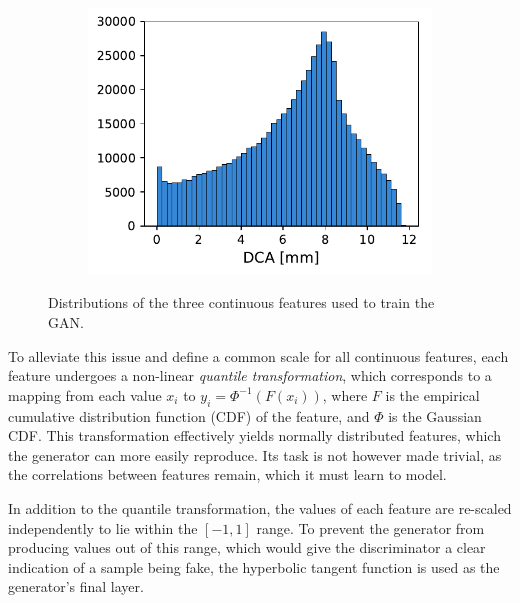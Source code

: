 \begin{figure}
{    \begin{subfigure}[t]{0.35\textwidth}
        \centering
        \hspace{-0.5cm}
        \includegraphics[width=\textwidth]{chapter4/real_doca.pdf}
    \end{subfigure}}
    \caption{Distributions of the three continuous features used to train the GAN.}
    \label{fig:original_feature_distributions}
\end{figure}

To alleviate this issue and define a common scale for all continuous features, each feature undergoes a non-linear \emph{quantile transformation}, which corresponds to a mapping from each value $x_i$ to $y_i = \Phi^{-1}(F(x_i))$, where $F$ is the empirical cumulative distribution function (CDF) of the feature, and $\Phi$ is the Gaussian CDF. This transformation effectively yields normally distributed features, which the generator can more easily reproduce. Its task is not however made trivial, as the correlations between features remain, which it must learn to model.

In addition to the quantile transformation, the values of each feature are re-scaled independently to lie within the $[-1, 1]$ range. To prevent the generator from producing values out of this range, which would give the discriminator a clear indication of a sample being fake, the hyperbolic tangent function is used as the generator's final layer.


